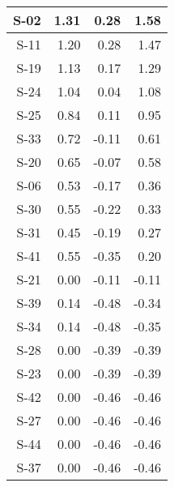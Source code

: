 \begin{tabular}{ | r | r | r | r | }
    \hline
                  S-02  &            1.31  &            0.28  &            1.58  \\
    \hline
                  S-11  &            1.20  &            0.28  &            1.47  \\
    \hline
                  S-19  &            1.13  &            0.17  &            1.29  \\
    \hline
                  S-24  &            1.04  &            0.04  &            1.08  \\
    \hline
                  S-25  &            0.84  &            0.11  &            0.95  \\
    \hline
                  S-33  &            0.72  &           -0.11  &            0.61  \\
    \hline
                  S-20  &            0.65  &           -0.07  &            0.58  \\
    \hline
                  S-06  &            0.53  &           -0.17  &            0.36  \\
    \hline
                  S-30  &            0.55  &           -0.22  &            0.33  \\
    \hline
                  S-31  &            0.45  &           -0.19  &            0.27  \\
    \hline
                  S-41  &            0.55  &           -0.35  &            0.20  \\
    \hline
                  S-21  &            0.00  &           -0.11  &           -0.11  \\
    \hline
                  S-39  &            0.14  &           -0.48  &           -0.34  \\
    \hline
                  S-34  &            0.14  &           -0.48  &           -0.35  \\
    \hline
                  S-28  &            0.00  &           -0.39  &           -0.39  \\
    \hline
                  S-23  &            0.00  &           -0.39  &           -0.39  \\
    \hline
                  S-42  &            0.00  &           -0.46  &           -0.46  \\
    \hline
                  S-27  &            0.00  &           -0.46  &           -0.46  \\
    \hline
                  S-44  &            0.00  &           -0.46  &           -0.46  \\
    \hline
                  S-37  &            0.00  &           -0.46  &           -0.46  \\

\end{tabular}
